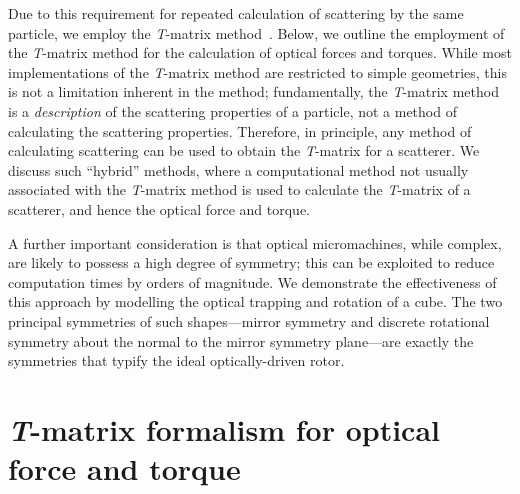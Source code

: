 \documentclass{article}
\begin{document}
Due to this requirement for repeated calculation of scattering by
the same particle, we employ the \textit{T}-matrix
method~\cite{waterman1971,mishchenko2004b}.
Below, we outline the employment of the \textit{T}-matrix method
for the calculation of optical forces and torques. While most
implementations of the \textit{T}-matrix method are
restricted to simple geometries, this is not a limitation
inherent in the method; fundamentally, the \textit{T}-matrix
method is a \emph{description} of the scattering properties of
a particle, not a method of calculating the scattering properties.
Therefore, in principle, any method of calculating scattering
can be used to obtain the \textit{T}-matrix for a scatterer.
We discuss such ``hybrid'' methods, where a computational method
not usually associated with the \textit{T}-matrix method is
used to calculate the \textit{T}-matrix of a scatterer, and hence
the optical force and torque.

A further important consideration is that optical micromachines,
while complex, are likely to possess a high degree of symmetry; this
can be exploited to reduce computation times by orders of magnitude.
We demonstrate the effectiveness of this approach by modelling
the optical trapping and rotation of a cube. The two principal
symmetries of such shapes---mirror symmetry and discrete rotational
symmetry about the normal to the mirror symmetry plane---are
exactly the symmetries that typify the ideal optically-driven rotor.


\section{\textit{T}-matrix formalism for optical force and torque}
\end{document}
